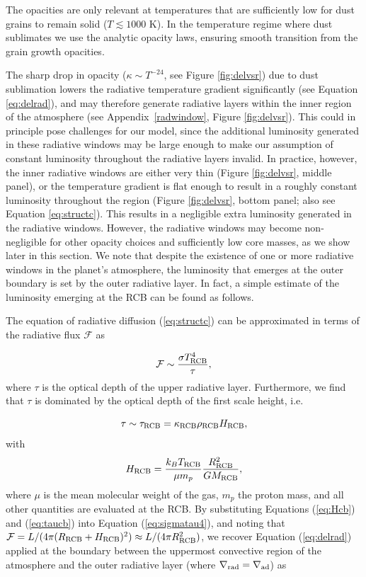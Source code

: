 \documentclass[apj]{emulateapj}
\newcommand{\delad}{\nabla_{\rm ad}}
\newcommand{\delrad}{\nabla_{\rm rad}}
\newcommand{\App}[1]{Appendix~\ref{#1}}
\newcommand{\cb}{_{\rm RCB}}
\begin{document}
The \citet{dalessio01} opacities are only relevant at temperatures that are sufficiently low for dust grains to remain solid ($T \lesssim 1000$ K). In the temperature regime where dust sublimates we use the \citet{bell94} analytic opacity laws, ensuring smooth transition from the grain growth opacities. 

The sharp drop in opacity ($\kappa \sim T^{-24}$, see Figure \ref{fig:delvsr}) due to dust sublimation lowers the radiative temperature gradient significantly (see Equation \ref{eq:delrad}), and may therefore generate radiative layers within the inner region of the atmosphere (see \App{radwindow}, Figure \ref{fig:delvsr}). This could in principle pose challenges for our model, since the additional luminosity generated in these radiative windows may be large enough to make our assumption of constant luminosity throughout the radiative layers invalid. In practice, however, the inner radiative windows are either very thin (Figure \ref{fig:delvsr}, middle panel), or the temperature gradient is flat enough to result in a roughly constant luminosity throughout the region (Figure \ref{fig:delvsr}, bottom panel; also see Equation \ref{eq:structc}). This results in a negligible extra luminosity generated in the radiative windows. However, the radiative windows may become non-negligible for other opacity choices and sufficiently low core masses, as we show later in this section. We note that despite the existence of one or more radiative windows in the planet's atmosphere, the luminosity that emerges at the outer boundary is set by the outer radiative layer. In fact, a simple estimate of the luminosity emerging at the RCB can be found as follows. 

The equation of radiative diffusion (\ref{eq:structc}) can be approximated in terms of the radiative flux $\mathcal{F}$ as 

\begin{equation}
\label{eq:sigmatau4}
\mathcal{F} \sim \frac{\sigma T\cb^4}{\tau},
\end{equation}
where $\tau$ is the optical depth of the upper radiative layer. Furthermore, we find that $\tau$ is dominated by the optical depth of the first scale height, i.e. 

\begin{equation}
\label{eq:taucb}
\tau \sim \tau\cb=\kappa\cb \rho\cb H\cb,
\end{equation}
with
\begin{equation}
\label{eq:Hcb}
H\cb=\frac{k_B T\cb}{\mu m_p} \frac{R\cb^2}{G M\cb},
\end{equation}
where $\mu$ is the mean molecular weight of the gas, $m_p$ the proton mass, and all other quantities are evaluated at the RCB. By substituting Equations (\ref{eq:Hcb}) and (\ref{eq:taucb}) into Equation (\ref{eq:sigmatau4}), and noting that $\mathcal{F}=L/(4 \pi (R\cb+H\cb)^2) \approx L / (4 \pi R\cb^2)$, we recover Equation (\ref{eq:delrad}) applied at the boundary between the uppermost convective region of the atmosphere and the outer radiative layer (where $\delrad=\delad$) as
\end{document}
